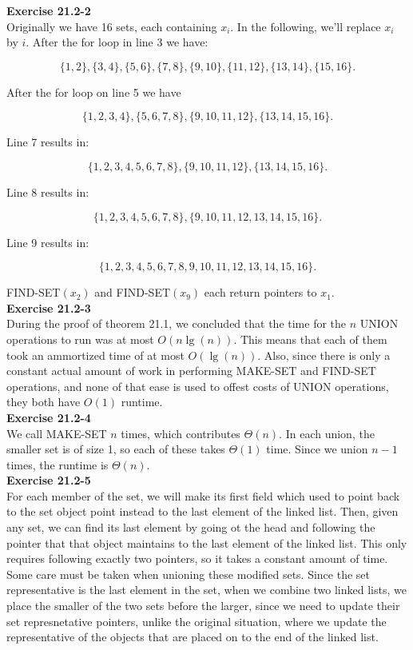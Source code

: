\documentclass{article}
\begin{document}
\noindent\textbf{Exercise 21.2-2}\\

Originally we have 16 sets, each containing $x_i$.  In the following, we'll replace $x_i$ by $i$.  After the for loop in line 3 we have:

\[ \{1,2\}, \{3,4\}, \{5,6\}, \{7,8\}, \{9,10\}, \{11,12\}, \{13,14\}, \{15,16\}.\]

After the for loop on line 5 we have

\[ \{1,2,3,4\}, \{5,6,7,8\}, \{9,10,11,12\}, \{13,14,15,16\}.\]

Line 7 results in:

\[ \{1,2,3,4,5,6,7,8\}, \{9,10,11,12\}, \{13,14,15,16\}.\]

Line 8 results in:

\[ \{1,2,3,4,5,6,7,8\}, \{9,10,11,12,13,14,15,16\}.\]

Line 9 results in:

\[ \{1,2,3,4,5,6,7,8,9,10,11,12,13,14,15,16\}.\]

FIND-SET$(x_2)$ and FIND-SET$(x_9)$ each return pointers to $x_1$. \\

\noindent\textbf{Exercise 21.2-3}\\

During the proof of theorem 21.1, we concluded that the time for the $n$ UNION operations to run was at most $O(n\lg(n))$. This means that each of them took an ammortized time of at most $O(\lg(n))$. Also, since there is only a constant actual amount of work in performing MAKE-SET and FIND-SET operations, and none of that ease is used to offest costs of UNION operations, they both have $O(1)$ runtime.\\

\noindent\textbf{Exercise 21.2-4}\\

We call MAKE-SET $n$ times, which contributes $\Theta(n)$.  In each union, the smaller set is of size 1, so each of these takes $\Theta(1)$ time.  Since we union $n-1$ times, the runtime is $\Theta(n)$. \\

\noindent\textbf{Exercise 21.2-5}\\

For each member of the set, we will make its first field which used to point back to the set object point instead to the last element of the linked list. Then, given any set, we can find its last element by going ot the head and following the pointer that that object maintains to the last element of the linked list. This only requires following exactly two pointers, so it takes a constant amount of time. Some care must be taken when unioning these modified sets. Since the set representative is the last element in the set, when we combine two linked lists, we place the smaller of the two sets before the larger, since we need to update their set represnetative pointers, unlike the original situation, where we update the representative of the objects that are placed on to the end of the linked list.\\
\end{document}
